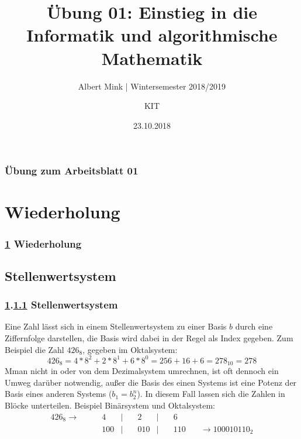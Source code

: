 \documentclass[c,18pt]{beamer}
\date{23.10.2018}
\title[Übung 01: Einstieg in die Informatik und algorithmische Mathematik]
  {Übung 01: Einstieg in die Informatik und algorithmische Mathematik}
\subtitle{Albert Mink | Wintersemester 2018/2019}
\author[Albert Mink, ]{KIT}
\institute[Institut für Angewandte und Numerische Mathematik (IANM)]{Institut für Angewandte und Numerische Mathematik}
\begin{document}
\begin{frame}
  \maketitle
\end{frame}

\begin{frame}
  \frametitle{Übung zum Arbeitsblatt 01}%
\tableofcontents[hideallsubsections]
\end{frame}

\section{Wiederholung}\label{K:wdh}
\begin{frame}
  \frametitle{\ref{K:wdh} Wiederholung}%
\tableofcontents[current]
\end{frame}


\def\stitle{Stellenwertsystem}
\subsection{\stitle}\label{S:Stellenwertsystem}
\begin{frame}[fragile]%
  \frametitle{\ref{K:wdh}.\ref{S:Stellenwertsystem} \stitle}%

Eine Zahl lässt sich in einem Stellenwertsystem zu einer Basis $b$ durch eine Ziffernfolge darstellen, die Basis wird dabei in der Regel als Index gegeben.
Zum Beispiel die Zahl $426_8$, gegeben im Oktalsystem:
\begin{equation*}
426_8 = 4*8^2 + 2*8^1 + 6*8^0 = 256 + 16 + 6 = 278_{10} = 278
\end{equation*}
M man nicht in oder von dem Dezimalsystem umrechnen, ist oft dennoch ein Umweg darüber notwendig, au\ss er die Basis des einen Systems ist eine Potenz der Basis eines anderen Systems ($b_1 = b_2^n$).
In diesem Fall lassen sich die Zahlen in Blöcke unterteilen.
Beispiel Binärsystem und Oktalsystem:
\begin{align*}
426_8 \rightarrow \quad & \quad   4 & | & \quad   2 & | & \quad   6 & \\
                        & \quad 100 & | & \quad 010 & | & \quad 110 & \quad \rightarrow 100010110_2
\end{align*}

\end{frame}
\end{document}
